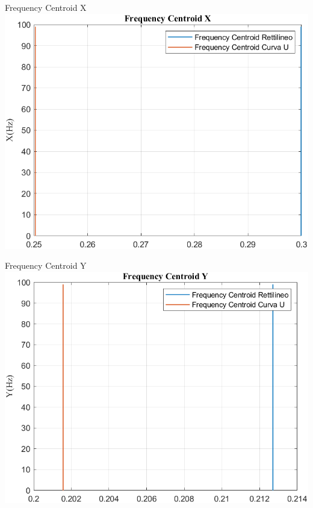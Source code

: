 \documentclass[beamer]{standalone}
\begin{document}
	\begin{frame}{{Frequency Centroid X}}
		\centering\includegraphics[height=.8\textheight]{figure/Mag/Trasformata/Frequency CentroidX}
	\end{frame}
	
	\begin{frame}{{Frequency Centroid Y}}
		\centering\includegraphics[height=.8\textheight]{figure/Mag/Trasformata/Frequency CentroidY}
	\end{frame}
	
\end{document}
